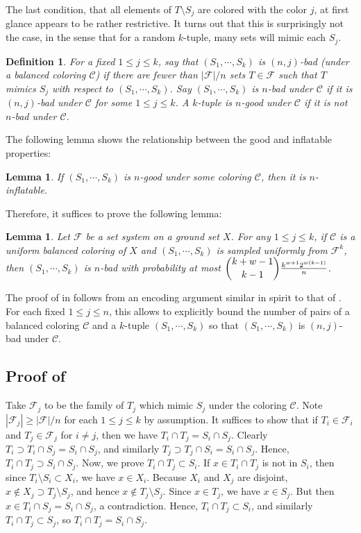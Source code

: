 \documentclass[12pt]{article}
\newtheorem{lemma}[theorem]{Lemma}
\newtheorem{definition}[theorem]{Definition}
\newcommand{\F}{\mathcal{F}}
\newcommand{\C}{\mathcal{C}}
\begin{document}
The last condition, that all elements of $T \setminus S_j$ are colored with the color $j$, at first glance appears to be rather restrictive.  It turns out that this is surprisingly not the case, in the sense that for a random $k$-tuple, many sets will mimic each $S_j$.

\begin{definition}
For a fixed $1 \le j \le k$, say that $(S_1, \cdots, S_k)$ is \emph{$(n,j)$-bad} (under a balanced coloring $\C$) if there are fewer than $|\F|/n$ sets $T \in \F$ such that $T$ mimics $S_j$ with respect to $(S_1, \cdots, S_k)$. Say $(S_1, \cdots, S_k)$ is \emph{$n$-bad} under $\C$ if it is $(n,j)$-bad under $\C$ for some $1 \le j \le k$. A $k$-tuple is \emph{$n$-good} under $\C$ if it is not $n$-bad under $\C$. \end{definition}

The following lemma shows the relationship between the good and inflatable properties:
\begin{lemma} If $(S_1, \cdots, S_k)$ is $n$-good under some coloring $\C$, then it is $n$-inflatable.
\label{lemma:color2inflate}	
\end{lemma} 

Therefore, it suffices to prove the following lemma:	
\begin{lemma}
\label{lemma:colorup}
	Let $\F$ be a set system on a ground set $X$. For any $1 \le j \le k$, if $\C$ is a uniform balanced coloring of $X$ and $(S_1, \cdots, S_k)$ is sampled uniformly from $\F^k$, then $(S_1, \cdots, S_k)$ is $n$-bad with probability at most $\dbinom{k+w-1}{k-1}\frac{k^{w+1}2^{w(k-1)}}{n}$. \end{lemma}
	
The proof of  in  follows from an encoding argument similar in spirit to that of \cite{alwz}.  For each fixed $1 \le j \le n$, this allows to explicitly bound the number of pairs of a balanced coloring $\C$ and a $k$-tuple $(S_1, \cdots, S_k)$ so that $(S_1, \cdots, S_k)$ is $(n,j)$-bad under $\C$.

\subsection{Proof of }

	Take $\F_j$ to be the family of $T_j$ which mimic $S_j$ under the coloring $\C$.  Note $|\F_j| \ge |\F|/n$ for each $1 \le j \le k$ by assumption. It suffices to show that if $T_i \in \F_i$ and $T_j \in \F_j$ for $i \neq j$, then we have $T_i \cap T_j=S_i \cap S_j$. Clearly $T_i \supset T_i \cap S_j=S_i \cap S_j$, and similarly $T_j \supset T_j \cap S_i=S_i \cap S_j$.  Hence, $T_i \cap T_j \supset S_i \cap S_j$.  Now, we prove $T_i \cap T_j \subset S_i$.  If $x \in T_i \cap T_j$ is not in $S_i$, then since $T_i \setminus S_i \subset X_i$, we have $x \in X_i$.  Because $X_i$ and $X_j$ are disjoint, $x \notin X_j \supset T_j \setminus S_j$, and hence $x \notin T_j \setminus S_j$.  Since $x \in T_j$, we have $x \in S_j$.  But then $x \in T_i \cap S_j=S_i \cap S_j$, a contradiction.  Hence, $T_i \cap T_j \subset S_i$, and similarly $T_i \cap T_j \subset S_j$, so $T_i \cap T_j=S_i \cap S_j$.
\end{document}
